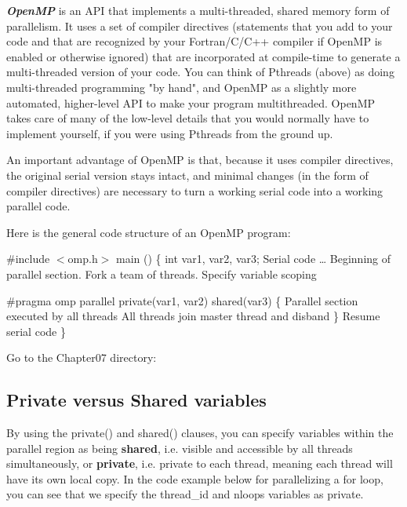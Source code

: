 \textbf{\textit{OpenMP}} is an API that implements a multi-threaded, shared memory form of parallelism. It uses a set of compiler directives (statements that you add to your code and that are recognized by your Fortran/C/C++ compiler if OpenMP is enabled or otherwise ignored) that are incorporated at compile-time to generate a multi-threaded version of your code. You can think of Pthreads (above) as doing multi-threaded programming "by hand", and OpenMP as a slightly more automated, higher-level API to make your program multithreaded. OpenMP takes care of many of the low-level details that you would normally have to implement yourself, if you were using Pthreads from the ground up.

An important advantage of OpenMP is that, because it uses compiler directives, the original serial version stays intact, and minimal changes (in the form of compiler directives) are necessary to turn a working serial code into a working parallel code.


Here is the general code structure of an OpenMP program:

\begin{prog}
\#include $<$omp.h$>$
main ()  \{
int var1, var2, var3;
Serial code
\dots
Beginning of parallel section. Fork a team of threads.
Specify variable scoping

\#pragma omp parallel private(var1, var2) shared(var3)
  \{
  Parallel section executed by all threads
  All threads join master thread and disband
  \}
Resume serial code
\}
\end{prog}

Go to the Chapter07 directory:

\begin{prompt}
$ %
\end{prompt}

\subsection{Private versus Shared variables}

By using the private() and shared() clauses, you can specify variables within the parallel region as being \textbf{shared}, i.e. visible and accessible by all threads simultaneously, or \textbf{private}, i.e. private to each thread, meaning each thread will have its own local copy. In the code example below for parallelizing a for loop, you can see that we specify the thread\_id and nloops variables as private.


